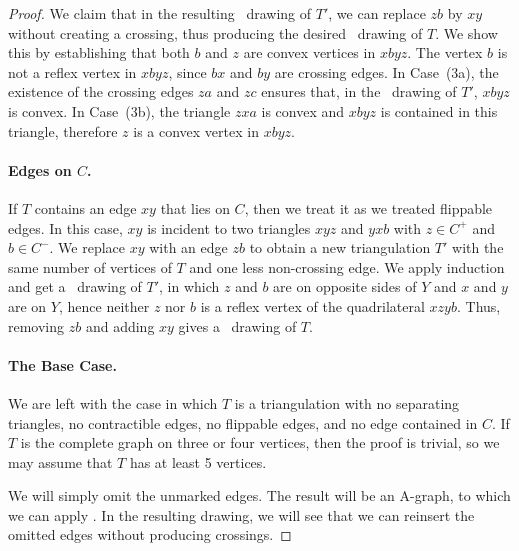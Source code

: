 \begin{proof}
We claim that in the resulting \Fary\ drawing of $T'$,
we can replace $zb$ by $xy$ without creating a crossing, thus producing
 the desired \Fary\ drawing of $T$.
%
We show this by establishing that both $b$ and $z$ are convex vertices in $xbyz$.
The vertex $b$ is not a reflex vertex in $xbyz$, since $bx$ and $by$ are crossing
edges.
                In Case~(3a), the existence of the
	crossing edges $za$ and $zc$ ensures that, in the \Fary\ drawing of $T'$,
	$xbyz$ is convex. In Case~(3b), the triangle $zxa$ is convex
        and $xbyz$ is contained in this triangle, therefore $z$ is
        a convex  vertex in $xbyz$.
	
	\paragraph{Edges on $C$.}
	
	If $T$ contains an edge $xy$ that lies on $C$, then we treat it as we treated flippable edges. In this case, $xy$ is incident to two triangles $xyz$ and $yxb$ with $z\in C^+$ and $b\in C^-$. We replace $xy$ with an edge $zb$ to obtain a new triangulation $T'$ with the same number of vertices of $T$ and one less non-crossing edge. We apply induction and get a \Fary\ drawing of $T'$, in which $z$ and $b$ are
	on opposite sides of $Y$ and $x$ and $y$ are on $Y$, hence 	neither $z$ nor $b$ is a reflex vertex of the quadrilateral $xzyb$.
	Thus, removing $zb$ and adding $xy$ gives a \Fary\ drawing of $T$.
	
	\paragraph{The Base Case.}
	
	We are left with the case in which $T$ is a triangulation
	with no separating triangles, no contractible edges, no flippable
	edges, and no edge contained in $C$.  If $T$ is the complete graph
	on three or four vertices, then the proof is trivial,
	so we may assume that $T$ has at least 5 vertices.

        We will simply omit the unmarked edges. The result will be an
        A-graph, to which we can apply . In the
        resulting drawing, we will see that we can reinsert the
        omitted edges without producing crossings.


\end{proof}
